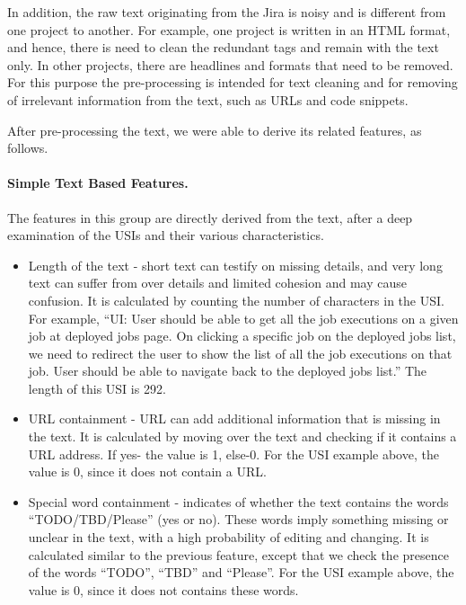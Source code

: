In addition, the raw text originating from the Jira is noisy and is different from one project to another. For example, one project is written in an HTML format, and hence, there is need to clean the redundant tags and remain with the text only. In other projects, there are headlines and formats that need to be removed. For this purpose the pre-processing is intended for text cleaning and for removing of irrelevant information from the text, such as URLs and code snippets. 

After pre-processing the text, we were able to derive its related features, as follows.


\paragraph{\textbf{Simple Text Based Features.}}
The features in this group are directly derived from the text, after a deep examination of the USIs and their various characteristics. %
\begin{itemize}
    \item Length of the text - short text can testify on missing details, and very long text can suffer from over details and limited cohesion and may cause confusion. It is calculated by counting the number of characters in the USI. For example, “UI: User should be able to get all the job executions on a given job at deployed jobs page. On clicking a specific job on the deployed jobs list, we need to redirect the user to show the list of all the job executions on that job. User should be able to navigate back to the deployed jobs list.” The length of this USI is 292.
    
    \item URL containment - URL can add additional information that is missing in the text. It is calculated by moving over the text and checking if it contains a URL address. If yes- the value is 1, else-0. For the USI example above, the value is 0, since it does not contain a URL.
    
    \item Special word containment - indicates of whether the text contains the words “TODO/TBD/Please” (yes or no). These words imply something missing or unclear in the text, with a high probability of editing and changing. It is calculated similar to the previous feature, except that we check the presence of the words “TODO”, “TBD” and “Please”. For the USI example above, the value is 0, since it does not contains these words.
\end{itemize}
